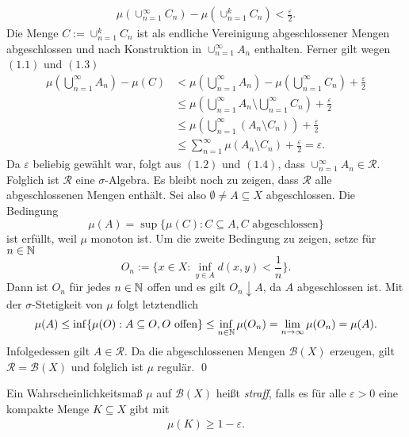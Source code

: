 \begin{proof*}
\begin{align}
    \mu(\cup_{n=1}^{\infty}C_n) - \mu(\cup_{n=1}^kC_n) < \frac{\varepsilon}{2}.
    \end{align}
    Die Menge $C:= \cup_{n=1}^kC_n$ ist als endliche Vereinigung abgeschlossener Mengen abgeschlossen und nach Konstruktion in $\cup_{n=1}^{\infty}A_n$ enthalten. Ferner gilt wegen $(1.1)$ und $(1.3)$
    \begin{align}
        \mu(\bigcup_{n=1}^{\infty}A_n) - \mu(C) &< \mu(\bigcup_{n=1}^{\infty}A_n) - \mu(\bigcup_{n=1}^{\infty}C_n) + \frac{\varepsilon}{2} \nonumber \\\
                                                &\leq \mu(\bigcup_{n=1}^{\infty}A_n \setminus \bigcup_{n=1}^{\infty}C_n)  + \frac{\varepsilon}{2} \nonumber \\\
                                                &\leq \mu(\bigcup_{n=1}^{\infty}(A_n \setminus C_n)) + \frac{\varepsilon}{2} \nonumber \\\
                                                &\leq \sum_{n=1}^{\infty}\mu(A_n \setminus C_n) + \frac{\varepsilon}{2} = \varepsilon. 
    \end{align}
    Da $\varepsilon$ beliebig gewählt war, folgt aus $(1.2)$ und $(1.4)$, dass $\cup_{n=1}^{\infty}A_n \in \mathcal{R}$. Folglich ist $\mathcal{R}$ eine $\sigma$-Algebra. 
    Es bleibt noch zu zeigen, dass $\mathcal{R}$ alle abgeschlossenen Mengen enthält. Sei also $\emptyset \neq A \subseteq X$ abgeschlossen. Die Bedingung 
    $$
        \mu(A) = \sup\{\mu(C): C \subseteq A, C\text{ abgeschlossen}\}
    $$
    ist erfüllt, weil $\mu$ monoton ist. Um die zweite Bedingung zu zeigen, setze für $n \in \mathbb{N}$
    $$
        O_n := \big\{x \in X: \inf_{y \in  A}d(x,y) < \frac{1}{n}\big\}.
    $$
    Dann ist $O_n$ für jedes $n \in \mathbb{N}$ offen und es gilt $O_n \downarrow A$, da $A$ abgeschlossen ist. 
    Mit der $\sigma$-Stetigkeit von $\mu$ folgt letztendlich 
    $$
        \mu(A) \leq \inf\{\mu(O): A \subseteq O, O \text{ offen}\} \leq \inf_{n \in \mathbb{N}}\mu(O_n) = \lim_{n \to \infty}\mu(O_n) = \mu(A). 
    $$
    Infolgedessen gilt $A \in \mathcal{R}$. Da die abgeschlossenen Mengen $\mathcal{B}(X)$ erzeugen, gilt $\mathcal{R} = \mathcal{B}(X)$ und folglich ist $\mu$ regulär. \qed
\end{proof*}
\begin{mydef}
    Ein Wahrscheinlichkeitsmaß $\mu$ auf $\mathcal{B}(X)$ heißt \textit{straff}, falls es für alle $\varepsilon > 0$ eine kompakte Menge $K \subseteq X$ gibt mit 
    \begin{align*}
        \mu(K) \geq 1 - \varepsilon. 
    \end{align*}

\end{mydef}

